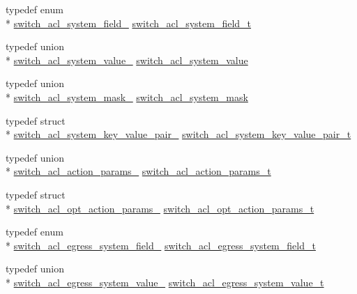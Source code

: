\begin{DoxyCompactItemize}
\item 
typedef enum \\*
\hyperlink{group__ACL_ga620cb3ced31cc813578d68b496991f0e}{switch\+\_\+acl\+\_\+system\+\_\+field\+\_\+} \hyperlink{group__ACL_gab50eaa35e57e14e7b50bbcb2c43c4012}{switch\+\_\+acl\+\_\+system\+\_\+field\+\_\+t}
\item 
typedef union \\*
\hyperlink{unionswitch__acl__system__value__}{switch\+\_\+acl\+\_\+system\+\_\+value\+\_\+} \hyperlink{group__ACL_gaee5058c582d2ac1022152bef17c061ea}{switch\+\_\+acl\+\_\+system\+\_\+value}
\item 
typedef union \\*
\hyperlink{unionswitch__acl__system__mask__}{switch\+\_\+acl\+\_\+system\+\_\+mask\+\_\+} \hyperlink{group__ACL_ga2477a68d4720b67cc14276c172e2a018}{switch\+\_\+acl\+\_\+system\+\_\+mask}
\item 
typedef struct \\*
\hyperlink{structswitch__acl__system__key__value__pair__}{switch\+\_\+acl\+\_\+system\+\_\+key\+\_\+value\+\_\+pair\+\_\+} \hyperlink{group__ACL_gacb401e5568e083878e6b2681fa8fbcc7}{switch\+\_\+acl\+\_\+system\+\_\+key\+\_\+value\+\_\+pair\+\_\+t}
\item 
typedef union \\*
\hyperlink{unionswitch__acl__action__params__}{switch\+\_\+acl\+\_\+action\+\_\+params\+\_\+} \hyperlink{group__ACL_gaf3edf5029fc2da06c40c02beacb8ab21}{switch\+\_\+acl\+\_\+action\+\_\+params\+\_\+t}
\item 
typedef struct \\*
\hyperlink{structswitch__acl__opt__action__params__}{switch\+\_\+acl\+\_\+opt\+\_\+action\+\_\+params\+\_\+} \hyperlink{group__ACL_gaf6629027c512d3f6976b8cd8eba8c4fb}{switch\+\_\+acl\+\_\+opt\+\_\+action\+\_\+params\+\_\+t}
\item 
typedef enum \\*
\hyperlink{group__ACL_ga2edc038cd515df04ca1426513fef2cf0}{switch\+\_\+acl\+\_\+egress\+\_\+system\+\_\+field\+\_\+} \hyperlink{group__ACL_gaa7bdcd874f436f3c04e22f49234d10a6}{switch\+\_\+acl\+\_\+egress\+\_\+system\+\_\+field\+\_\+t}
\item 
typedef union \\*
\hyperlink{unionswitch__acl__egress__system__value__}{switch\+\_\+acl\+\_\+egress\+\_\+system\+\_\+value\+\_\+} \hyperlink{group__ACL_ga08645f3f0eeca88bbcdd1caa9732bb09}{switch\+\_\+acl\+\_\+egress\+\_\+system\+\_\+value\+\_\+t}
\item 

\end{DoxyCompactItemize}
